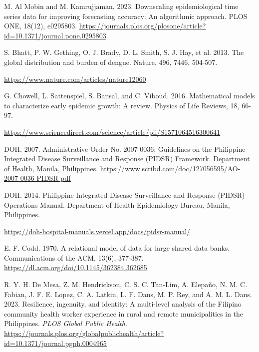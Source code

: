 \documentclass[
]{article}
\begin{document}
M. Al Mobin and M. Kamrujjaman. 2023. Downscaling epidemiological time
series data for improving forecasting accuracy: An algorithmic approach.
PLOS ONE, 18(12), e0295803.
\href{https://journals.plos.org/plosone/article?id=10.1371/journal.pone.0295803}{\ul{https://journals.plos.org/plosone/article?id=10.1371/journal.pone.0295803}}

S. Bhatt, P. W. Gething, O. J. Brady, D. L. Smith, S. J. Hay, et al.
2013. The global distribution and burden of dengue. Nature, 496, 7446,
504-507.

\href{https://www.nature.com/articles/nature12060}{\ul{https://www.nature.com/articles/nature12060}}

G. Chowell, L. Sattenspiel, S. Bansal, and C. Viboud. 2016. Mathematical
models to characterize early epidemic growth: A review. Physics of Life
Reviews, 18, 66-97.

\href{https://www.sciencedirect.com/science/article/pii/S1571064516300641}{\ul{https://www.sciencedirect.com/science/article/pii/S1571064516300641}}

DOH. 2007. Administrative Order No. 2007-0036: Guidelines on the
Philippine Integrated Disease Surveillance and Response (PIDSR)
Framework. Department of Health, Manila, Philippines.
\href{https://www.scribd.com/doc/127056595/AO-2007-0036-PIDSR-pdf}{\ul{https://www.scribd.com/doc/127056595/AO-2007-0036-PIDSR-pdf}}

\textbf{\hfill\break
}DOH. 2014. Philippine Integrated Disease Surveillance and Response
(PIDSR) Operations Manual. Department of Health Epidemiology Bureau,
Manila, Philippines.

\href{https://doh-hospital-manuals.vercel.app/docs/pidsr-manual/}{\ul{https://doh-hospital-manuals.vercel.app/docs/pidsr-manual/}}

E. F. Codd. 1970. A relational model of data for large shared data
banks. Communications of the ACM, 13(6), 377-387.
\href{https://dl.acm.org/doi/10.1145/362384.362685}{\ul{https://dl.acm.org/doi/10.1145/362384.362685}}

R. Y. H. De Mesa, Z. M. Hendrickson, C. S. C. Tan-Lim, A. Elepaño, N. M.
C. Fabian, J. F. E. Lopez, C. A. Latkin, L. F. Dans, M. P. Rey, and A.
M. L. Dans. 2023. Resilience, ingenuity, and identity: A multi-level
analysis of the Filipino community health worker experience in rural and
remote municipalities in the Philippines. \emph{PLOS Global Public
Health}.
\href{https://journals.plos.org/globalpublichealth/article?id=10.1371/journal.pgph.0004965}{\ul{https://journals.plos.org/globalpublichealth/article?id=10.1371/journal.pgph.0004965}}
\end{document}
